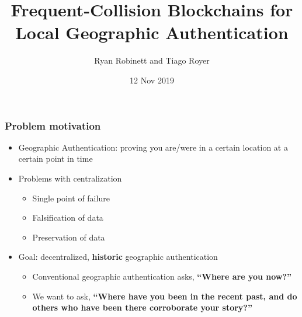 \documentclass{beamer}
\begin{document}
\title{Frequent-Collision Blockchains for Local Geographic Authentication}
\author{Ryan Robinett and Tiago Royer}
\date{12 Nov 2019}

\begin{frame}
    \titlepage
\end{frame}

\begin{frame}
	\frametitle{Problem motivation}

	\begin{itemize}
		\item Geographic Authentication:
			proving you are/were in a certain location
			at a certain point in time
		\item Problems with centralization
			\begin{itemize}
				\item Single point of failure
				\item Falsification of data
				\item Preservation of data
			\end{itemize}
		\item Goal: decentralized, \textbf{historic} geographic authentication
			\begin{itemize}
				\item Conventional geographic authentication asks, \textbf{``Where are you now?''}
				\item We want to ask, \textbf{``Where have you been in the recent past, and do others who have been there corroborate your story?''}
			\end{itemize}
	\end{itemize}
\end{frame}
\end{document}

